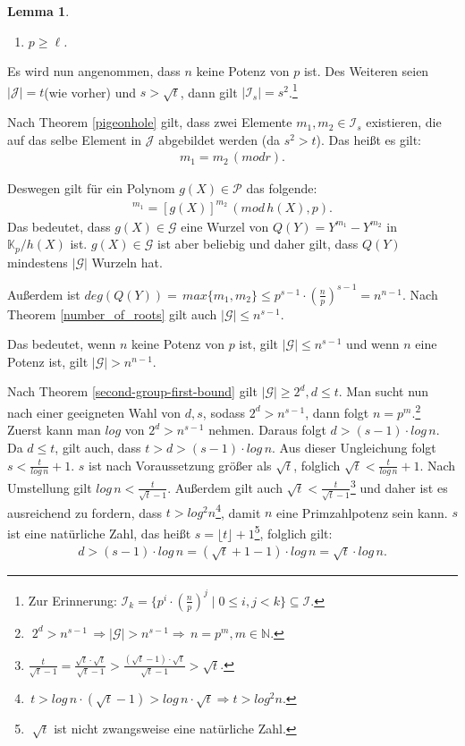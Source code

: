\documentclass[12pt,oneside]{article}
\newtheorem{lemma}[theorem]{Lemma}
\theoremstyle{remark}
\theoremstyle{definition}
\begin{document}
\begin{flushleft}
\begin{lemma}
\begin{enumerate}
\item $p \geq \ell$.
\end{enumerate}
\end{lemma}

Es wird nun angenommen, dass $n$ keine Potenz von $p$ ist. Des Weiteren seien $|\mathcal{J}| = t$(wie vorher) und $s > \sqrt{t}$, dann gilt $|\mathcal{I}_s| = s^2$.\footnote{Zur Erinnerung: $\mathcal{I}_k= \{ p^{i} \cdot (\frac{n}{p})^j \mid 0 \leq i,j < k\} \subseteq \mathcal{I}$.}

Nach Theorem \ref{pigeonhole} gilt, dass zwei Elemente $m_{1},m_{2} \in \mathcal{I}_s$ existieren, die auf das selbe Element in $\mathcal{J}$ abgebildet werden (da $s^2 > t $). Das heißt es gilt:
\begin{align*}
    m_{1} = m_{2} \, (mod r).
\end{align*}

Deswegen gilt für ein Polynom $g(X) \in \mathcal{P}$ das folgende:
\begin{align*}
    [g(X)]^{m_1} = [g(X)]^{m_2} \, (mod \, h(X), p).
\end{align*}
Das bedeutet, dass $g(X) \in \mathcal{G}$ eine Wurzel von $Q(Y) = Y^{m_1} - Y^{m_2}$ in $\mathbb{K}_p/h(X)$ ist. $g(X) \in \mathcal{G}$ ist aber beliebig und daher gilt, dass $Q(Y)$ mindestens $|\mathcal{G}|$ Wurzeln hat.

Außerdem ist $deg (Q(Y)) = \, max\{ m_1,m_2 \} \leq p^{s - 1} \cdot (\frac{n}{p})^{s - 1} = n^{n - 1}$. Nach Theorem \ref{number_of_roots} gilt auch $|\mathcal{G}| \leq n^{s - 1}$. 

Das bedeutet, wenn $n$ keine Potenz von $p$ ist, gilt $|\mathcal{G}| \leq n^{s - 1}$ und wenn $n$ eine Potenz ist, gilt $|\mathcal{G}| > n^{n - 1}$.

Nach Theorem \ref{second-group-first-bound} gilt $|\mathcal{G}| \geq 2^d, d \leq t$. Man sucht nun nach einer geeigneten Wahl von $d,s$, sodass $2^d > n^{s - 1}$, dann folgt $n = p^m$.\footnote{$ \; 2^d > n^{s - 1} \, \Rightarrow |\mathcal{G}| > n^{s - 1} \Rightarrow \, n = p^m ,m \in \mathbb{N}$.} Zuerst kann man $log$ von $2^d > n^{s - 1}$ nehmen. Daraus folgt $d > (s - 1) \cdot log \, n$. Da $d \leq t$, gilt auch, dass $t > d > (s - 1) \cdot log \, n$. Aus dieser Ungleichung folgt $s < \frac{t}{log \, n} + 1$. $s$ ist nach Voraussetzung größer als $\sqrt{t}$, folglich $\sqrt{t} < \frac{t}{log \, n} + 1 $. Nach Umstellung gilt $ log \, n < \frac{t}{\sqrt{t} - 1}$. Außerdem gilt auch $\sqrt{t} <  \frac{t}{\sqrt{t} - 1}$\footnote{$\frac{t}{\sqrt{t} - 1} = \frac{\sqrt{t} \cdot \sqrt{t}}{\sqrt{t} - 1} > \frac{(\sqrt{t} - 1) \cdot \sqrt{t}}{\sqrt{t} - 1} > \sqrt{t}$.} und daher ist es ausreichend zu fordern, dass $t > log^2 n$\footnote{$\, t > log \, n \cdot (\sqrt{t} - 1) > log \, n \cdot \sqrt{t} \Rightarrow t > log^2 n$.}, damit $n$ eine Primzahlpotenz sein kann. $s$ ist eine natürliche Zahl, das heißt $s = \lfloor t \rfloor + 1$\footnote{$\; \sqrt{t}$ ist nicht zwangsweise eine natürliche Zahl.}, folglich gilt:
\begin{align*}
    d > (s - 1) \cdot log \, n = (\sqrt{t} + 1 - 1) \cdot log \, n = \sqrt{t} \cdot log \, n. 
\end{align*}


\end{flushleft}
\end{document}
